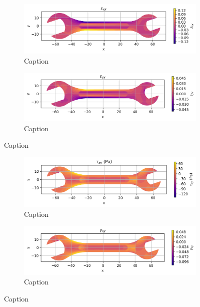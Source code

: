 \documentclass{article}  %
\begin{document}
\begin{figure}[H]
  \centering
  \begin{subfigure}[t]{0.49\textwidth}
    \centering
    \includegraphics[width=\textwidth]{GRAFICOS/Case a - epsilon_xx.png}
    \caption{Caption}
    \label{fig:deformada_reacciones}
  \end{subfigure}
  \hfill
  \begin{subfigure}[t]{0.49\textwidth}
    \centering
    \includegraphics[width=\textwidth]{GRAFICOS/Case a - epsilon_yy.png}
    \caption{Caption}
    \label{fig:von_mises}
  \end{subfigure}
  \caption{Caption}
  \label{fig:analisis_estructural}
\end{figure}

\begin{figure}[H]
  \centering
  \begin{subfigure}[t]{0.49\textwidth}
    \centering
    \includegraphics[width=\textwidth]{GRAFICOS/Case a - tau_xy.png}
    \caption{Caption}
    \label{fig:deformada_reacciones}
  \end{subfigure}
  \hfill
  \begin{subfigure}[t]{0.49\textwidth}
    \centering
    \includegraphics[width=\textwidth]{GRAFICOS/Case a - gamma_xy.png}
    \caption{Caption}
    \label{fig:von_mises}
  \end{subfigure}
  \caption{Caption}
  \label{fig:analisis_estructural}
\end{figure}
\end{document}
